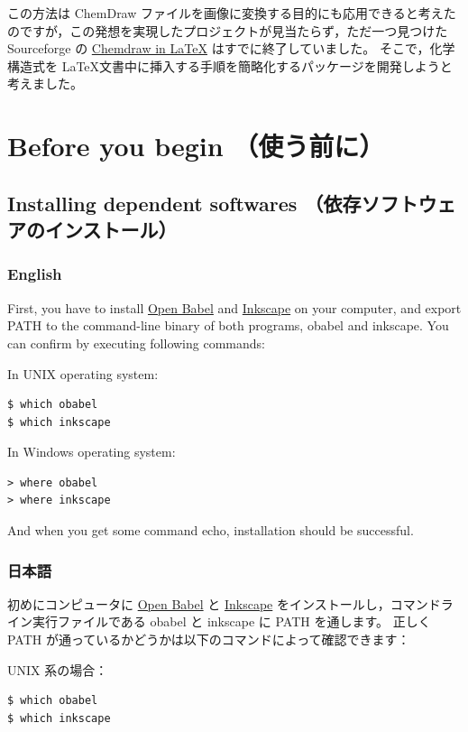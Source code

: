 \documentclass[12pt]{jsarticle}
\begin{document}
この方法は ChemDraw ファイルを画像に変換する目的にも応用できると考えたのですが，この発想を実現したプロジェクトが見当たらず，ただ一つ見つけた Sourceforge の \href{http://chemdrawinlatex.sourceforge.net/}{Chemdraw in \LaTeX} はすでに終了していました。
そこで，化学構造式を \LaTeX 文書中に挿入する手順を簡略化するパッケージを開発しようと考えました。

\clearpage

\section{Before you begin （使う前に）}

\subsection{Installing dependent softwares （依存ソフトウェアのインストール）}

\subsubsection{English}

First, you have to install \href{http://openbabel.org/}{Open Babel} and \href{https://inkscape.org/en/}{Inkscape} on your computer, and export PATH to the command-line binary of both programs, obabel and inkscape.
You can confirm by executing following commands:

In UNIX operating system:
\begin{verbatim}
$ which obabel
$ which inkscape
\end{verbatim}

In Windows operating system:
\begin{verbatim}
> where obabel
> where inkscape
\end{verbatim}

And when you get some command echo, installation should be successful.

\subsubsection{日本語}

初めにコンピュータに \href{http://openbabel.org/}{Open Babel} と \href{https://inkscape.org/ja/}{Inkscape} をインストールし，コマンドライン実行ファイルである obabel と inkscape に PATH を通します。
正しく PATH が通っているかどうかは以下のコマンドによって確認できます：

UNIX 系の場合：
\begin{verbatim}
$ which obabel
$ which inkscape
\end{verbatim}
\end{document}
